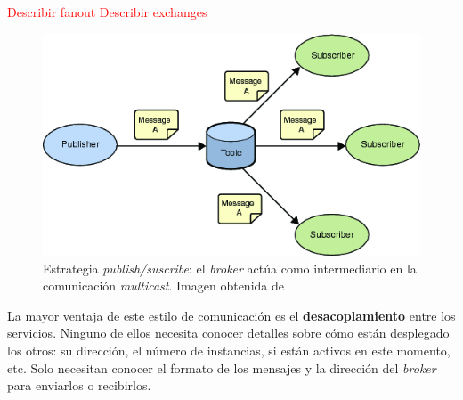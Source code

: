 \textcolor{red}{Describir fanout}
\textcolor{red}{Describir exchanges}

\begin{figure}[htb]
  \centering
  \includegraphics[scale=0.5]{cap_arquitectura/images/publish_subscribe}
  \caption[Estrategia \emph{publish/suscribe}: el \emph{broker} actúa como intermediario en la comunicación \emph{multicast}.]{Estrategia \emph{publish/suscribe}: el \emph{broker} actúa como intermediario en la comunicación \emph{multicast}. Imagen obtenida de \footnotemark}
  \label{fig:publish-subscribe}
\end{figure}


La mayor ventaja de este estilo de comunicación es el \textbf{desacoplamiento} entre los servicios. \cite{korabUnderstandingMessageBrokers2017}
Ninguno de ellos necesita conocer detalles sobre cómo están desplegado los otros: su dirección, el número de instancias, si están activos en este momento, etc. Solo necesitan conocer el formato de los mensajes y la dirección del \emph{broker} para enviarlos o recibirlos.

